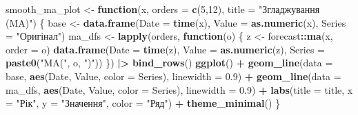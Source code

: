 \documentclass[
]{article}
\newenvironment{Shaded}{\begin{snugshade}}{\end{snugshade}}
\newcommand{\AttributeTok}[1]{\textcolor[rgb]{0.13,0.29,0.53}{#1}}
\newcommand{\ControlFlowTok}[1]{\textcolor[rgb]{0.13,0.29,0.53}{\textbf{#1}}}
\newcommand{\DecValTok}[1]{\textcolor[rgb]{0.00,0.00,0.81}{#1}}
\newcommand{\FloatTok}[1]{\textcolor[rgb]{0.00,0.00,0.81}{#1}}
\newcommand{\FunctionTok}[1]{\textcolor[rgb]{0.13,0.29,0.53}{\textbf{#1}}}
\newcommand{\NormalTok}[1]{#1}
\newcommand{\OtherTok}[1]{\textcolor[rgb]{0.56,0.35,0.01}{#1}}
\newcommand{\SpecialCharTok}[1]{\textcolor[rgb]{0.81,0.36,0.00}{\textbf{#1}}}
\newcommand{\StringTok}[1]{\textcolor[rgb]{0.31,0.60,0.02}{#1}}
\begin{document}
\begin{Shaded}
\begin{Highlighting}[]
\NormalTok{smooth\_ma\_plot }\OtherTok{\textless{}{-}} \ControlFlowTok{function}\NormalTok{(x, }\AttributeTok{orders =} \FunctionTok{c}\NormalTok{(}\DecValTok{5}\NormalTok{,}\DecValTok{12}\NormalTok{), }\AttributeTok{title =} \StringTok{"Згладжування (MA)"}\NormalTok{) \{}
\NormalTok{  base }\OtherTok{\textless{}{-}} \FunctionTok{data.frame}\NormalTok{(}\AttributeTok{Date =} \FunctionTok{time}\NormalTok{(x), }\AttributeTok{Value =} \FunctionTok{as.numeric}\NormalTok{(x), }\AttributeTok{Series =} \StringTok{"Оригінал"}\NormalTok{)}
\NormalTok{  ma\_dfs }\OtherTok{\textless{}{-}} \FunctionTok{lapply}\NormalTok{(orders, }\ControlFlowTok{function}\NormalTok{(o) \{}
\NormalTok{    z }\OtherTok{\textless{}{-}}\NormalTok{ forecast}\SpecialCharTok{::}\FunctionTok{ma}\NormalTok{(x, }\AttributeTok{order =}\NormalTok{ o)}
    \FunctionTok{data.frame}\NormalTok{(}\AttributeTok{Date =} \FunctionTok{time}\NormalTok{(z), }\AttributeTok{Value =} \FunctionTok{as.numeric}\NormalTok{(z), }\AttributeTok{Series =} \FunctionTok{paste0}\NormalTok{(}\StringTok{"MA("}\NormalTok{, o, }\StringTok{")"}\NormalTok{))}
\NormalTok{  \}) }\SpecialCharTok{|\textgreater{}} \FunctionTok{bind\_rows}\NormalTok{()}
  \FunctionTok{ggplot}\NormalTok{() }\SpecialCharTok{+}
    \FunctionTok{geom\_line}\NormalTok{(}\AttributeTok{data =}\NormalTok{ base, }\FunctionTok{aes}\NormalTok{(Date, Value, }\AttributeTok{color =}\NormalTok{ Series), }\AttributeTok{linewidth =} \FloatTok{0.9}\NormalTok{) }\SpecialCharTok{+}
    \FunctionTok{geom\_line}\NormalTok{(}\AttributeTok{data =}\NormalTok{ ma\_dfs, }\FunctionTok{aes}\NormalTok{(Date, Value, }\AttributeTok{color =}\NormalTok{ Series), }\AttributeTok{linewidth =} \FloatTok{0.9}\NormalTok{) }\SpecialCharTok{+}
    \FunctionTok{labs}\NormalTok{(}\AttributeTok{title =}\NormalTok{ title, }\AttributeTok{x =} \StringTok{"Рік"}\NormalTok{, }\AttributeTok{y =} \StringTok{"Значення"}\NormalTok{, }\AttributeTok{color =} \StringTok{"Ряд"}\NormalTok{) }\SpecialCharTok{+}
    \FunctionTok{theme\_minimal}\NormalTok{()}
\NormalTok{\}}


\end{Highlighting}
\end{Shaded}
\end{document}

